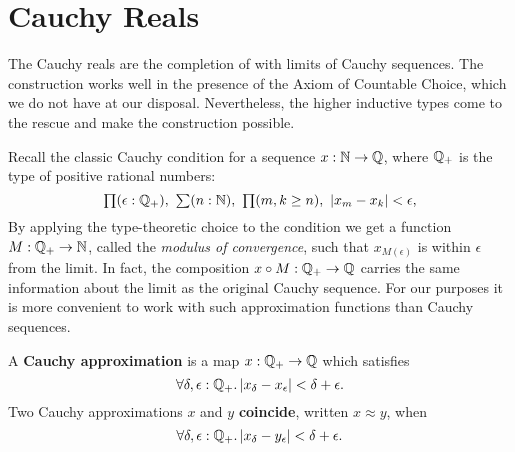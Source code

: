 \section{Cauchy Reals}
\label{sec:cauchy-reals}

The Cauchy reals are the completion of \Q with limits of Cauchy sequences. The
construction works well in the presence of the Axiom of Countable Choice, which we do not
have at our disposal. Nevertheless, the higher inductive types come to the rescue and make
the construction possible.

Recall the classic Cauchy condition for a sequence $x : \mathbb{N} \to \mathbb{Q}$, where $\mathbb{Q}_{+}$ is the
type of positive rational numbers:
%
\[ \prd{\epsilon : \Qp} \sm{n : \N} \prd{m, k \geq n} |x_m - x_k| < \epsilon, \]
%
By applying the type-theoretic choice to the condition we get a function $M : \mathbb{Q}_{+} \to \mathbb{N}$,
called the \emph{modulus of convergence}, such that $x_{M(\epsilon)}$ is within $\epsilon$
from the limit. In fact, the composition $x \circ M : \mathbb{Q}_{+} \to \mathbb{Q}$ carries the same
information about the limit as the original Cauchy sequence. For our purposes it is more
convenient to work with such approximation functions than Cauchy sequences.

\begin{defn}\label{defn:cauchy-approximation}
  A \textbf{Cauchy approximation} is a map $x : \mathbb{Q}_{+} \to \mathbb{Q}$ which satisfies
  \begin{equation}
    \label{eq:cauchy-approx}
    \fall{\delta, \epsilon :\Qp} |x_\delta - x_\epsilon| < \delta + \epsilon.
  \end{equation}
  Two Cauchy approximations $x$ and $y$ \textbf{coincide}, written $x \approx y$, when
  \begin{equation}
    \label{eq:cauchy-coincide}
    \fall{\delta, \epsilon:\Qp} |x_\delta - y_\epsilon| < \delta + \epsilon.
  \end{equation}
\end{defn}

